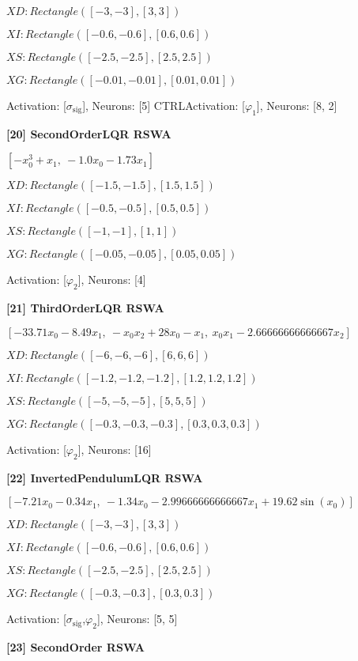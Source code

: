  $XD: Rectangle([-3, -3], [3, 3]) $

$XI: Rectangle([-0.6, -0.6], [0.6, 0.6]) $

$XS: Rectangle([-2.5, -2.5], [2.5, 2.5]) $

$XG: Rectangle([-0.01, -0.01], [0.01, 0.01]) $


Activation: [$\sigma_{\mathrm{sig}}$], Neurons: [5]
CTRLActivation: [$\varphi_{1}$], Neurons: [8, 2]

\textbf{ [20] SecondOrderLQR RSWA }

$\left[ - x_{0}^{3} + x_{1}, \  - 1.0 x_{0} - 1.73 x_{1}\right]$ 
 
 $XD: Rectangle([-1.5, -1.5], [1.5, 1.5]) $

$XI: Rectangle([-0.5, -0.5], [0.5, 0.5]) $

$XS: Rectangle([-1, -1], [1, 1]) $

$XG: Rectangle([-0.05, -0.05], [0.05, 0.05]) $


Activation: [$\varphi_{2}$], Neurons: [4]

\textbf{ [21] ThirdOrderLQR RSWA }

$\left[ - 33.71 x_{0} - 8.49 x_{1}, \  - x_{0} x_{2} + 28 x_{0} - x_{1}, \  x_{0} x_{1} - 2.66666666666667 x_{2}\right]$ 
 
 $XD: Rectangle([-6, -6, -6], [6, 6, 6]) $

$XI: Rectangle([-1.2, -1.2, -1.2], [1.2, 1.2, 1.2]) $

$XS: Rectangle([-5, -5, -5], [5, 5, 5]) $

$XG: Rectangle([-0.3, -0.3, -0.3], [0.3, 0.3, 0.3]) $


Activation: [$\varphi_{2}$], Neurons: [16]

\textbf{ [22] InvertedPendulumLQR RSWA }

$\left[ - 7.21 x_{0} - 0.34 x_{1}, \  - 1.34 x_{0} - 2.99666666666667 x_{1} + 19.62 \sin{\left(x_{0} \right)}\right]$ 
 
 $XD: Rectangle([-3, -3], [3, 3]) $

$XI: Rectangle([-0.6, -0.6], [0.6, 0.6]) $

$XS: Rectangle([-2.5, -2.5], [2.5, 2.5]) $

$XG: Rectangle([-0.3, -0.3], [0.3, 0.3]) $


Activation: [$\sigma_{\mathrm{sig}}$,$\varphi_{2}$], Neurons: [5, 5]

\textbf{ [23] SecondOrder RSWA }

\left[ - x_{0}^{3} + x_{1}, \  u_{0}\right] 
 
